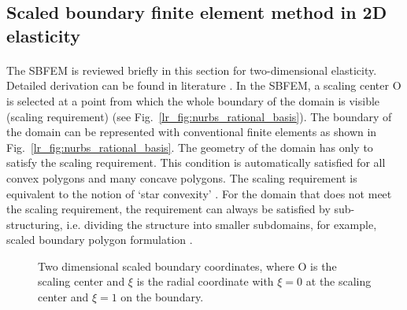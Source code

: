\subsection{Scaled boundary finite element method in 2D elasticity}
\paragraph{}
The SBFEM is reviewed briefly in this section for two-dimensional elasticity.
Detailed derivation can be found in literature \cite{Wolf1996, WOLF20015551, Deeks2002}.
In the SBFEM, a scaling center O is selected at a point from which the whole boundary of the domain is visible (scaling requirement) (see Fig.~\ref{lr_fig:nurbs_rational_basis}).
The boundary of the domain can be represented with conventional finite elements as shown in Fig.~\ref{lr_fig:nurbs_rational_basis}.
The geometry of the domain has only to satisfy the scaling requirement.
This condition is automatically satisfied for all convex polygons and many concave polygons.
The scaling requirement is equivalent to the notion of `star convexity' \cite{Bishop2014}.
For the domain that does not meet the scaling requirement, the requirement can always be satisfied by sub-structuring, i.e. dividing the structure into smaller subdomains, for example, scaled boundary polygon formulation \cite{NATARAJAN2014101}.
\begin{figure}[!ht]
    \centering
    \label{lr_fig:sbfem_desc}
    \caption{Two dimensional scaled boundary coordinates, where O is the scaling center and $\xi$ is the radial coordinate with $\xi=0$ at the scaling center and $\xi=1$ on the boundary.}
\end{figure}

